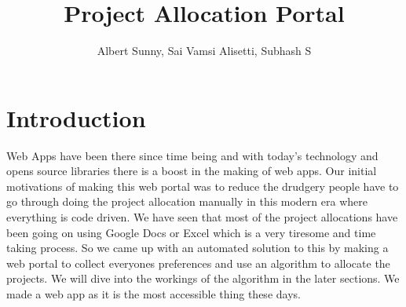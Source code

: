 \documentclass{article}
\title{Project Allocation Portal}
\author{Albert Sunny, Sai Vamsi Alisetti, Subhash S}
\date{}
\begin{document}
\maketitle

\section{Introduction}

Web Apps have been there since time being and with today's technology and opens source libraries there is a boost in the making of web apps. Our initial motivations of making this web portal was to reduce the drudgery people have to go through doing the project allocation manually in this modern era where everything is code driven. We have seen that most of the project allocations have been going on using Google Docs or Excel which is a very tiresome and time taking process. So we came up with an automated solution to this by making a web portal to collect everyones preferences and use an algorithm to allocate the projects. We will dive into the workings of the algorithm in the later sections. We made a web app as it is the most accessible thing these days. 
\end{document}

